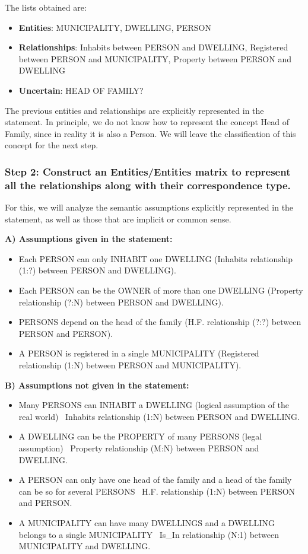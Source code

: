 \documentclass{article}
\numberwithin{figure}{section}
\begin{document}
The lists obtained are:

\begin{itemize}
    \item \textbf{Entities}: MUNICIPALITY, DWELLING, PERSON
    \item \textbf{Relationships}: Inhabits between PERSON and DWELLING, Registered between PERSON and MUNICIPALITY, Property between PERSON and DWELLING
    \item \textbf{Uncertain}: HEAD OF FAMILY?
\end{itemize}

The previous entities and relationships are explicitly represented in the statement.  In principle, we do not know how to represent the concept Head of Family, since in reality it is also a Person.  We will leave the classification of this concept for the next step.

\subsubsection*{Step 2: Construct an Entities/Entities matrix to represent all the relationships along with their correspondence type.}

For this, we will analyze the semantic assumptions explicitly represented in the statement, as well as those that are implicit or common sense.

\textbf{A) Assumptions given in the statement:}

\begin{itemize}
    \item Each PERSON can only INHABIT one DWELLING (Inhabits relationship (1:?) between PERSON and DWELLING).
    \item Each PERSON can be the OWNER of more than one DWELLING (Property relationship (?:N) between PERSON and DWELLING).
    \item PERSONS depend on the head of the family (H.F. relationship (?:?) between PERSON and PERSON).
    \item A PERSON is registered in a single MUNICIPALITY (Registered relationship (1:N) between PERSON and MUNICIPALITY).
\end{itemize}

\textbf{B) Assumptions not given in the statement:}

\begin{itemize}
    \item Many PERSONS can INHABIT a DWELLING (logical assumption of the real world) \textrightarrow ~Inhabits relationship (1:N) between PERSON and DWELLING.
    \item A DWELLING can be the PROPERTY of many PERSONS (legal assumption) \textrightarrow ~Property relationship (M:N) between PERSON and DWELLING.
    \item A PERSON can only have one head of the family and a head of the family can be so for several PERSONS \textrightarrow ~H.F. relationship (1:N) between PERSON and PERSON.
    \item A MUNICIPALITY can have many DWELLINGS and a DWELLING belongs to a single MUNICIPALITY \textrightarrow ~Is\_In relationship (N:1) between MUNICIPALITY and DWELLING.
\end{itemize}
\end{document}
